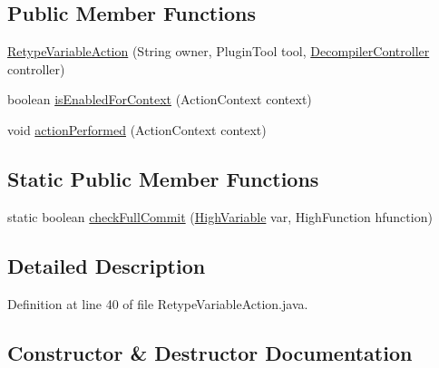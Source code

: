 \subsection*{Public Member Functions}
\begin{DoxyCompactItemize}
\item 
\mbox{\hyperlink{classghidra_1_1app_1_1plugin_1_1core_1_1decompile_1_1actions_1_1_retype_variable_action_a93ad12c874a8bf0ae7582815d20098e3}{Retype\+Variable\+Action}} (String owner, Plugin\+Tool tool, \mbox{\hyperlink{classghidra_1_1app_1_1decompiler_1_1component_1_1_decompiler_controller}{Decompiler\+Controller}} controller)
\item 
boolean \mbox{\hyperlink{classghidra_1_1app_1_1plugin_1_1core_1_1decompile_1_1actions_1_1_retype_variable_action_a8146e16bb37975dc024530409532dba1}{is\+Enabled\+For\+Context}} (Action\+Context context)
\item 
void \mbox{\hyperlink{classghidra_1_1app_1_1plugin_1_1core_1_1decompile_1_1actions_1_1_retype_variable_action_a32493365e12a8b6545b765e7718cd6ea}{action\+Performed}} (Action\+Context context)
\end{DoxyCompactItemize}
\subsection*{Static Public Member Functions}
\begin{DoxyCompactItemize}
\item 
static boolean \mbox{\hyperlink{classghidra_1_1app_1_1plugin_1_1core_1_1decompile_1_1actions_1_1_retype_variable_action_a72953b7e56191b41bfbaae3e2ec00657}{check\+Full\+Commit}} (\mbox{\hyperlink{class_high_variable}{High\+Variable}} var, High\+Function hfunction)
\end{DoxyCompactItemize}


\subsection{Detailed Description}


Definition at line 40 of file Retype\+Variable\+Action.\+java.



\subsection{Constructor \& Destructor Documentation}
\mbox{\label{classghidra_1_1app_1_1plugin_1_1core_1_1decompile_1_1actions_1_1_retype_variable_action_a93ad12c874a8bf0ae7582815d20098e3}} 
